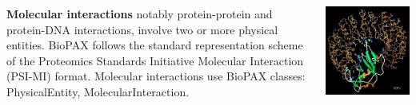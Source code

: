 \begin{frame}
\begin{columns}[t]
\begin{column}{0.5\textwidth}
\begin{block}{\textbf{Molecular interactions}}
notably protein-protein and
protein-DNA interactions, involve two or more physical entities. BioPAX follows the standard representation scheme of the Proteomics Standards Initiative Molecular Interaction (PSI-MI) format. Molecular interactions use BioPAX classes: PhysicalEntity, MolecularInteraction.
\end{block}
\end{column}
\begin{column}{0.5\textwidth}
\begin{center}
\includegraphics[width=1.0\textwidth]{fig/ProtProtInt.jpg}
\end{center}
\end{column}
\end{columns}
\end{frame}
